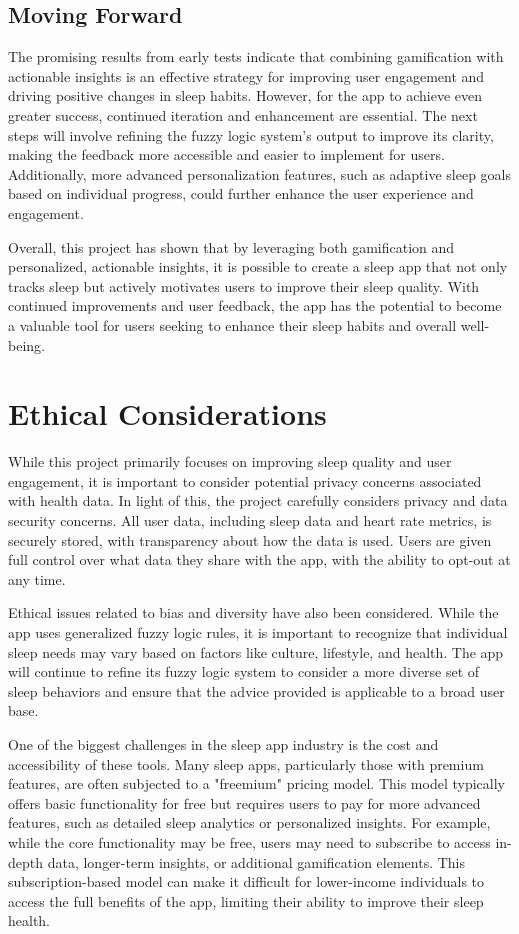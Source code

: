 \documentclass[10pt,twocolumn]{article}
\begin{document}
\subsection{Moving Forward} The promising results from early tests indicate that combining gamification with actionable insights is an effective strategy for improving user engagement and driving positive changes in sleep habits. However, for the app to achieve even greater success, continued iteration and enhancement are essential. The next steps will involve refining the fuzzy logic system's output to improve its clarity, making the feedback more accessible and easier to implement for users. Additionally, more advanced personalization features, such as adaptive sleep goals based on individual progress, could further enhance the user experience and engagement.

Overall, this project has shown that by leveraging both gamification and personalized, actionable insights, it is possible to create a sleep app that not only tracks sleep but actively motivates users to improve their sleep quality. With continued improvements and user feedback, the app has the potential to become a valuable tool for users seeking to enhance their sleep habits and overall well-being.

\section{Ethical Considerations}

While this project primarily focuses on improving sleep quality and user engagement, it is important to consider potential privacy concerns associated with health data. In light of this, the project carefully considers privacy and data security concerns. All user data, including sleep data and heart rate metrics, is securely stored, with transparency about how the data is used. Users are given full control over what data they share with the app, with the ability to opt-out at any time.

Ethical issues related to bias and diversity have also been considered. While the app uses generalized fuzzy logic rules, it is important to recognize that individual sleep needs may vary based on factors like culture, lifestyle, and health. The app will continue to refine its fuzzy logic system to consider a more diverse set of sleep behaviors and ensure that the advice provided is applicable to a broad user base.

One of the biggest challenges in the sleep app industry is the cost and accessibility of these tools. Many sleep apps, particularly those with premium features, are often subjected to a "freemium" pricing model. This model typically offers basic functionality for free but requires users to pay for more advanced features, such as detailed sleep analytics or personalized insights\cite{sleep-app-paywall}. For example, while the core functionality may be free, users may need to subscribe to access in-depth data, longer-term insights, or additional gamification elements. This subscription-based model can make it difficult for lower-income individuals to access the full benefits of the app, limiting their ability to improve their sleep health.
\end{document}
